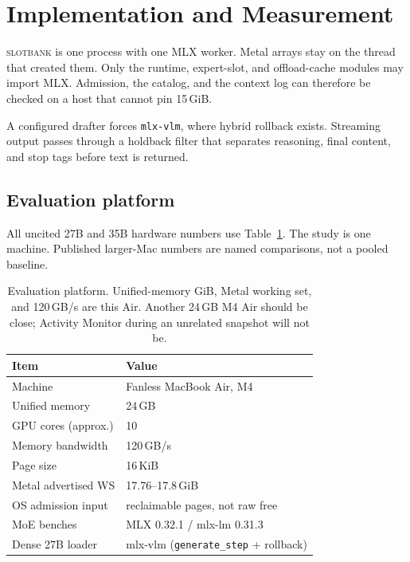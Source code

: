 \documentclass[11pt]{article}
\theoremstyle{definition}
\newcommand{\slotbank}{\textsc{slotbank}}
\begin{document}
\section{Implementation and Measurement}
\label{sec:impl}

\slotbank{} is one process with one MLX worker. Metal arrays stay on the thread that created them. Only the runtime, expert-slot, and offload-cache modules may import MLX. Admission, the catalog, and the context log can therefore be checked on a host that cannot pin 15\,GiB.

A configured drafter forces \texttt{mlx-vlm}, where hybrid rollback exists. Streaming output passes through a holdback filter that separates reasoning, final content, and stop tags before text is returned.

\subsection{Evaluation platform}

All uncited 27B and 35B hardware numbers use Table~\ref{tab:host}. The study is one machine. Published larger-Mac numbers are named comparisons, not a pooled baseline.

\begin{table}[t]
\centering
\caption{Evaluation platform. Unified-memory GiB, Metal working set, and 120\,GB/s are this Air. Another 24\,GB M4 Air should be close; Activity Monitor during an unrelated snapshot will not be.}
\label{tab:host}
\small
\begin{tabular}{@{}ll@{}}
\toprule
Item & Value \\
\midrule
Machine & Fanless MacBook Air, M4 \\
Unified memory & 24\,GB \\
GPU cores (approx.) & 10 \\
Memory bandwidth & 120\,GB/s \\
Page size & 16\,KiB \\
Metal advertised WS & 17.76--17.8\,GiB \\
OS admission input & reclaimable pages, not raw free \\
MoE benches & MLX 0.32.1 / mlx-lm 0.31.3 \\
Dense 27B loader & mlx-vlm (\texttt{generate\_step} + rollback) \\
\bottomrule
\end{tabular}
\end{table}
\end{document}
